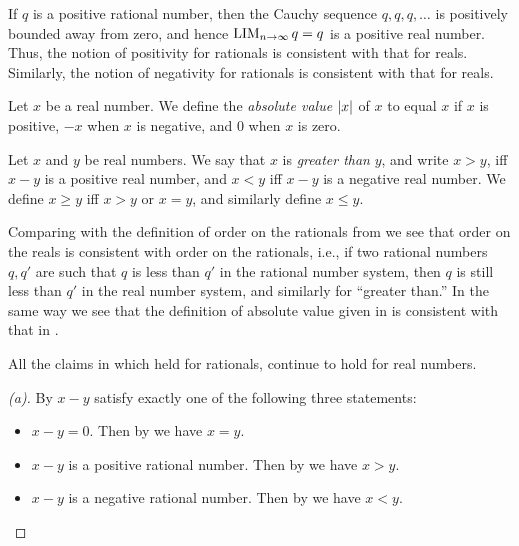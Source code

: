 \begin{note}
  If \(q\) is a positive rational number, then the Cauchy sequence \(q, q, q, \dots\) is positively bounded away from zero, and hence \(\operatorname*{LIM}_{n \to \infty} q = q\) is a positive real number.
  Thus, the notion of positivity for rationals is consistent with that for reals.
  Similarly, the notion of negativity for rationals is consistent with that for reals.
\end{note}

\begin{defn}\label{i:5.4.5}
  Let \(x\) be a real number.
  We define the \emph{absolute value} \(\left\lvert x\right\rvert\) of \(x\) to equal \(x\) if \(x\) is positive, \(-x\) when \(x\) is negative, and \(0\) when \(x\) is zero.
\end{defn}

\begin{defn}\label{i:5.4.6}
  Let \(x\) and \(y\) be real numbers.
  We say that \(x\) is \emph{greater than} \(y\), and write \(x > y\), iff \(x - y\) is a positive real number, and \(x < y\) iff \(x - y\) is a negative real number.
  We define \(x \geq y\) iff \(x > y\) or \(x = y\), and similarly define \(x \leq y\).
\end{defn}

\begin{note}
  Comparing  with the definition of order on the rationals from  we see that order on the reals is consistent with order on the rationals, i.e., if two rational numbers \(q, q'\) are such that \(q\) is less than \(q'\) in the rational number system, then \(q\) is still less than \(q'\) in the real number system, and similarly for ``greater than.''
  In the same way we see that the definition of absolute value given in  is consistent with that in .
\end{note}

\begin{prop}\label{i:5.4.7}
  All the claims in  which held for rationals, continue to hold for real numbers.
\end{prop}

\begin{proof}[(a)]
  By  \(x - y\) satisfy exactly one of the following three statements:
  \begin{itemize}
    \item \(x - y = 0\).
          Then by  we have \(x = y\).
    \item \(x - y\) is a positive rational number.
          Then by  we have \(x > y\).
    \item \(x - y\) is a negative rational number.
          Then by  we have \(x < y\).
  \end{itemize}
\end{proof}

